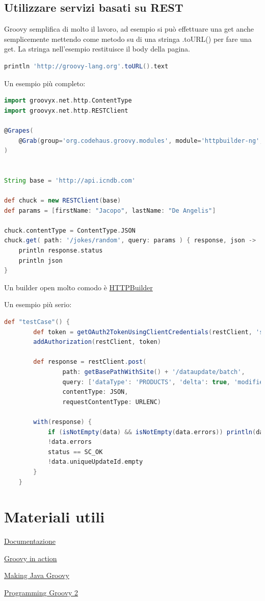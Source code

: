 \documentclass[11pt,a4paper]{book}
\begin{document}
\section{Utilizzare servizi basati su REST}
Groovy semplifica di molto il lavoro, ad esempio si può effettuare una get anche semplicemente mettendo come metodo su di una stringa .toURL() per fare una get. La stringa nell'esempio restituisce il body della pagina.
\begin{lstlisting}[language = groovy]
println 'http://groovy-lang.org'.toURL().text
\end{lstlisting}

Un esempio più completo:
\begin{lstlisting}[language = groovy]
import groovyx.net.http.ContentType
import groovyx.net.http.RESTClient

@Grapes(
    @Grab(group='org.codehaus.groovy.modules', module='httpbuilder-ng', version='0.9.1')
)


String base = 'http://api.icndb.com'

def chuck = new RESTClient(base)
def params = [firstName: "Jacopo", lastName: "De Angelis"]

chuck.contentType = ContentType.JSON
chuck.get( path: '/jokes/random', query: params ) { response, json ->
    println response.status
    println json
}
\end{lstlisting}

Un builder open molto comodo è \href{https://github.com/jgritman/httpbuilder/}{HTTPBuilder}

Un esempio più serio:
\begin{lstlisting}[language = groovy]
def "testCase"() {
        def token = getOAuth2TokenUsingClientCredentials(restClient, 'superup_trusted_client', getClientSecret())
        addAuthorization(restClient, token)

        def response = restClient.post(
                path: getBasePathWithSite() + '/dataupdate/batch',
                query: ['dataType': 'PRODUCTS', 'delta': true, 'modifiedSinceTimestamp': 10000000],
                contentType: JSON,
                requestContentType: URLENC)

        with(response) {
            if (isNotEmpty(data) && isNotEmpty(data.errors)) println(data)
            !data.errors
            status == SC_OK
            !data.uniqueUpdateId.empty
        }
    }
\end{lstlisting}

\chapter{Materiali utili}
\href{https://groovy-lang.org/}{Documentazione}

\href{https://www.manning.com/books/groovy-in-action-second-edition}{Groovy in action}

\href{https://www.manning.com/books/making-java-groovy}{Making Java Groovy}

\href{https://pragprog.com/titles/vslg2/programming-groovy-2/}{Programming Groovy 2}
\end{document}
